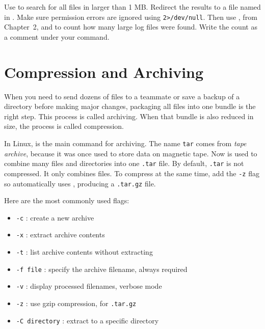 \begin{challengebox}
Use  to search for all  files in  larger than 1 MB. Redirect the results to a file named  in . Make sure permission errors are ignored using \texttt{2>/dev/null}. Then use , from Chapter~2, and  to count how many large log files were found. Write the count as a comment under your command.
\end{challengebox}

\section{Compression and Archiving}
\label{sec:archive}

When you need to send dozens of files to a teammate or save a backup of a directory before making major changes, packaging all files into one bundle is the right step. This process is called archiving. When that bundle is also reduced in size, the process is called compression.

In Linux,  is the main command for archiving. The name \texttt{tar} comes from \textit{tape archive}, because it was once used to store data on magnetic tape. Now  is used to combine many files and directories into one \texttt{.tar} file. By default, \texttt{.tar} is not compressed. It only combines files. To compress at the same time, add the \texttt{-z} flag so  automatically uses , producing a \texttt{.tar.gz} file.

Here are the most commonly used  flags:

\begin{itemize}
    \item \texttt{-c} : create a new archive
    \item \texttt{-x} : extract archive contents
    \item \texttt{-t} : list archive contents without extracting
    \item \texttt{-f file} : specify the archive filename, always required
    \item \texttt{-v} : display processed filenames, verbose mode
    \item \texttt{-z} : use gzip compression, for \texttt{.tar.gz}
    \item \texttt{-C directory} : extract to a specific directory
\end{itemize}

